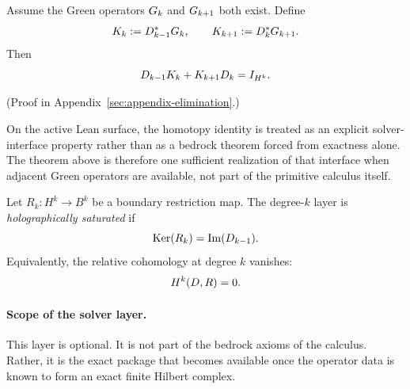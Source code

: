\begin{theorem}
\label{thm:homotopy-identity}
Assume the Green operators \(G_{k}\) and \(G_{k+1}\) both exist.
Define
\[
K_{k} := D_{k-1}^* G_{k},
\qquad
K_{k+1} := D_k^* G_{k+1}.
\]
Then
\[
D_{k-1} K_{k} + K_{k+1} D_k = I_{H^k}.
\]
\end{theorem}

(Proof in Appendix~\ref{sec:appendix-elimination}.)

\begin{remark}
\label{rem:solver-layer-lean-boundary}
On the active Lean surface, the homotopy identity is treated as an explicit
solver-interface property rather than as a bedrock theorem forced from
exactness alone. The theorem above is therefore one sufficient realization of
that interface when adjacent Green operators are available, not part of the
primitive calculus itself.
\end{remark}

\begin{definition}
\label{def:holographic-saturation}
Let $R_k : H^k \to B^k$ be a boundary restriction map. The degree-$k$ layer is
\emph{holographically saturated} if
\[
\mathrm{Ker}(R_k) = \mathrm{Im}(D_{k-1}).
\]
Equivalently, the relative cohomology at degree $k$ vanishes:
\[
H^{k}(D,R) = 0.
\]
\end{definition}

\paragraph{Scope of the solver layer.}
This layer is optional. It is not part of the bedrock axioms of the calculus.
Rather, it is the exact package that becomes available once the operator data
is known to form an exact finite Hilbert complex.
